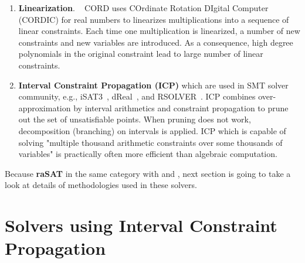 \begin{enumerate}
\item \textbf{Linearization}. ~
CORD \cite{cordic} uses COrdinate Rotation DIgital Computer (CORDIC) for real numbers to linearizes multiplications into a sequence of linear constraints. Each time one multiplication is linearized, a number of new constraints and new variables are introduced. As a consequence, high degree polynomials in the original constraint lead to large number of linear constraints. 

\item \textbf{Interval Constraint Propagation (ICP)} 
which are used in SMT solver community, e.g., iSAT3~\cite{isat}, 
dReal~\cite{dRealCADE13}, and RSOLVER~\cite{rsolver}. 
ICP combines over-approximation by interval arithmetics and constraint propagation to prune out the set of unsatisfiable points. When pruning does not work, decomposition (branching) on intervals is applied. 
ICP which is capable of solving "multiple thousand arithmetic constraints over some thousands of variables" \cite{isat} is practically often more efficient than algebraic computation.
\end{enumerate}

Because \textbf{raSAT} in the same category with  and , next section is going to take a look at details of methodologies used in these solvers.

\section{Solvers using Interval Constraint Propagation}
